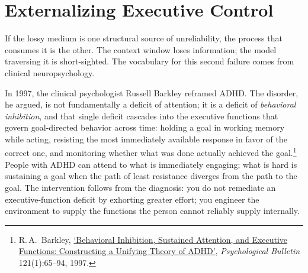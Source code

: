 \documentclass[11pt, a4paper]{article}
\begin{document}
\section{Externalizing Executive Control}

If the lossy medium is one structural source of unreliability, the process that consumes
it is the other. The context window loses information; the model traversing it is
short-sighted. The vocabulary for this second failure comes from clinical neuropsychology.

In 1997, the clinical psychologist Russell Barkley reframed ADHD. The disorder, he argued,
is not fundamentally a deficit of attention; it is a deficit of \emph{behavioral
inhibition}, and that single deficit cascades into the executive functions that govern
goal-directed behavior across time: holding a goal in working memory while acting,
resisting the most immediately available response in favor of the correct one, and
monitoring whether what was done actually achieved the
goal.\footnote{R.\,A.~Barkley, \href{https://doi.org/10.1037/0033-2909.121.1.65}{`Behavioral
Inhibition, Sustained Attention, and Executive Functions: Constructing a Unifying Theory
of ADHD'}, \emph{Psychological Bulletin} 121(1):65--94, 1997.} People with ADHD can attend
to what is immediately engaging; what is hard is sustaining a goal when the path of least
resistance diverges from the path to the goal. The intervention follows from the
diagnosis: you do not remediate an executive-function deficit by exhorting greater effort;
you engineer the environment to supply the functions the person cannot reliably supply
internally.
\end{document}
